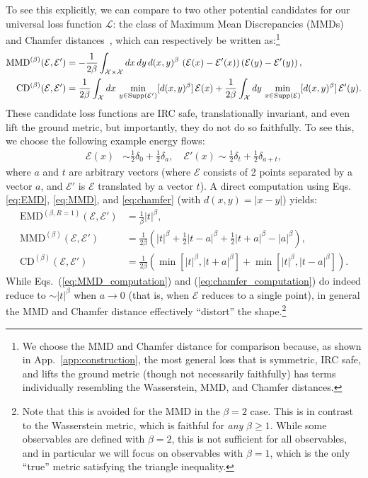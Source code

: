 \documentclass[letterpaper,11pt]{article}
\newcommand{\E}{\mathcal{E}}
\newcommand{\X}{\mathcal{X}}
\newcommand{\EMD}{\text{EMD}}
\DeclareRobustCommand{\App}[1]{App.~\ref{app:#1}}
\DeclareRobustCommand{\Eqs}[2]{Eqs.~(\ref{eq:#1}) and (\ref{eq:#2})}
\begin{document}
To see this explicitly, we can compare to two other potential candidates for our universal loss function $\mathcal{L}$: the class of Maximum Mean Discrepancies (MMDs)~\cite{ramdas2017wasserstein} and Chamfer distances~\cite{10.5555/1622943.1622971}, which can respectively be written as:\footnote{We choose the MMD and Chamfer distance for comparison because, as shown in \App{construction}, the most general loss that is symmetric, IRC safe, and lifts the ground metric (though not necessarily faithfully) has terms individually resembling the Wasserstein, MMD, and Chamfer distances.}
%
\begin{align}
    \text{MMD}^{(\beta)}(\E, \E') &= -\frac{1}{2\beta}\int_{\X\times\X}dx\, dy\, d(x,y)^\beta\, \left(\E(x)-\E'(x)\right)\left(\E(y)-\E'(y)\right),\label{eq:MMD} \\
    \text{CD}^{(\beta)}(\E, \E') &= \frac{1}{2\beta}\int_{\X}dx\,\min_{y\in{\rm Supp}(\E')}[d(x,y)^\beta]\,\E(x) + \frac{1}{2\beta}\int_{\X}dy\,\min_{x\in{\rm Supp}(\E)}[d(x,y)^\beta]\,\E'(y).\label{eq:chamfer}
\end{align}
%
These candidate loss functions are IRC safe, translationally invariant, and even lift the ground metric, but importantly, they do not do so faithfully. To see this, we choose the following example energy flows:
%
\begin{align}
    \E(x) &\sim \frac{1}{2}\delta_0 + \frac{1}{2}\delta_a, \quad \E'(x) \sim \frac{1}{2}\delta_t + \frac{1}{2}\delta_{a+t},
\end{align}
%
where $a$ and $t$ are arbitrary vectors (where $\E$ consists of 2 points separated by a vector $a$, and $\E'$ is $\E$ translated by a vector $t$).
%
A direct computation using Eqs. \eqref{eq:EMD}, \eqref{eq:MMD}, and  \eqref{eq:chamfer} (with $d(x,y) = |x-y|$) yields:
%
\begin{align}
    \EMD^{(\beta,R=1)}(\E,\E') &= \frac{1}{\beta}|t|^\beta, \\
    \text{MMD}^{(\beta)}(\E, \E') &= \frac{1}{2\beta}\left(|t|^\beta + \frac{1}{2}|t-a|^\beta + \frac{1}{2}|t+a|^\beta -|a|^\beta \right),\label{eq:MMD_computation}\\
    \text{CD}^{(\beta)}(\E, \E') &= \frac{1}{2\beta}\left(\min\left[|t|^\beta, |t+a|^\beta\right] + \min\left[|t|^\beta, |t-a|^\beta\right] \right).\label{eq:chamfer_computation}
\end{align}
%
While \Eqs{MMD_computation}{chamfer_computation} do indeed reduce to $\sim|t|^\beta$ when $a\to0$ (that is, when $\E$ reduces to a single point), in general the MMD and Chamfer distance effectively ``distort'' the shape.\footnote{Note that this is avoided for the MMD in the $\beta = 2$ case. This is in contrast to the Wasserstein metric, which is faithful for \emph{any} $\beta \geq 1$. While some observables are defined with $\beta = 2$, this is not sufficient for all observables, and in particular we will focus on observables with $\beta = 1$, which is the only ``true'' metric satisfying the triangle inequality.}
\end{document}
